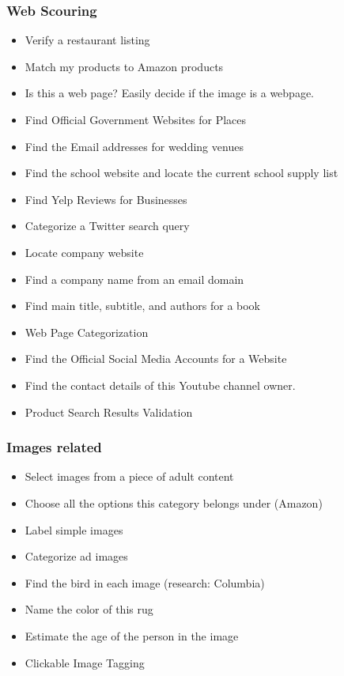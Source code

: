 \documentclass[slides]{beamer} %
\begin{document}
\begin{frame}\frametitle{Web Scouring}

\begin{itemize} %
\item Verify a restaurant listing
\item Match my products to Amazon products
\item Is this a web page? Easily decide if the image is a webpage.
\item Find Official Government Websites for Places
\item Find the Email addresses for wedding venues
\item Find the school website and locate the current school supply list
\item Find Yelp Reviews for Businesses
\item Categorize a Twitter search query
\item Locate company website
\item Find a company name from an email domain
\item Find main title, subtitle, and authors for a book
\item Web Page Categorization
\item Find the Official Social Media Accounts for a Website
\item Find the contact details of this Youtube channel owner.
\item Product Search Results Validation
\end{itemize}

\end{frame}

\begin{frame}\frametitle{Images related}

\begin{itemize} %
\item Select images from a piece of adult content
\item Choose all the options this category belongs under (Amazon)
\item Label simple images
\item Categorize ad images
\item Find the bird in each image (research: Columbia)
\item Name the color of this rug
\item Estimate the age of the person in the image
\item Clickable Image Tagging
\end{itemize}

\end{frame}
\end{document}
